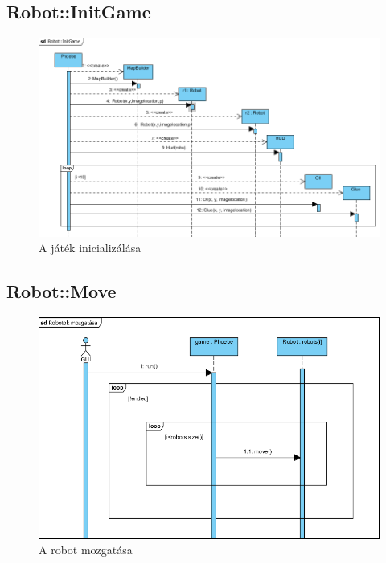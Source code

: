 \subsection{Robot::InitGame}
\begin{figure}[h]
\begin{center}
\includegraphics[width=17cm]{images/RobotInitGame.PNG}
\caption{A játék inicializálása}
\label{fig:example7}
\end{center}
\end{figure}
\pagebreak

\subsection{Robot::Move}
\begin{figure}[h]
\begin{center}
\includegraphics[width=17cm]{images/RobotMove.png}
\caption{A robot mozgatása}
\label{fig:example8}
\end{center}
\end{figure}
\pagebreak

